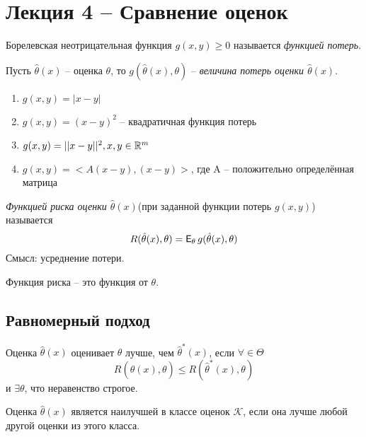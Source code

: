 \section{Лекция 4 -- Сравнение оценок}

\begin{definition}
Борелевская неотрицательная функция $g(x, y) \ge 0$ называется \emph{функцией потерь}.
\end{definition}

\begin{definition}
Пусть $\hat{\theta}(x)$ -- оценка $\theta$, то $g(\hat{\theta}(x), \theta)$ -- \emph{величина потерь оценки $\hat{\theta}(x)$}.
\end{definition}

\begin{example}
\begin{enumerate}
    \item $g(x, y) = |x - y|$
    \item $g(x, y) = (x - y)^2$ -- квадратичная функция потерь
    \item $g(x, y) = ||x - y||^2, x,y \in \mathbb{R}^m$
    \item $g(x, y) = <A(x - y), (x - y)>$, где A --  положительно определённая матрица
\end{enumerate}
\end{example}

\begin{definition}
\emph{Функцией риска оценки $\hat{\theta}(x)$}(при заданной функции потерь $g(x, y)$) называется
$$
R(\hat{\theta}(x), \theta) = \E_{\theta}g(\hat{\theta}(x), \theta)
$$
Смысл: усреднение потери.
\end{definition}

\begin{remark}
Функция риска -- это функция от $\theta$.
\end{remark}

\subsection{Равномерный подход}
\begin{definition}
Оценка $\hat{\theta}(x)$ оценивает $\theta$ лучше, чем $\hat{\theta}^{*}(x)$, если $\forall \in \Theta$
$$
R(\hat{\theta}(x), \theta) \le R(\hat{\theta}^{*}(x), \theta)
$$
и $\exists \theta$, что неравенство строгое.
\end{definition}

\begin{definition}
Оценка $\hat{\theta}(x)$ является наилучшей в классе оценок $\mathcal{K}$, если она лучше любой другой оценки из этого класса.
\end{definition}

